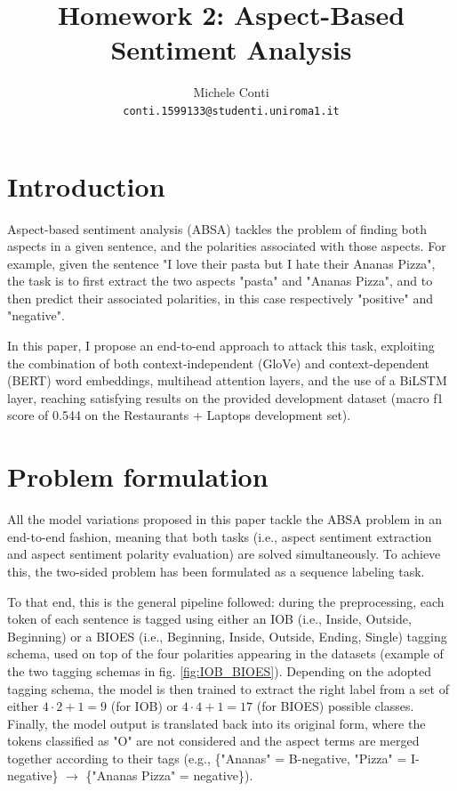 \documentclass[11pt,a4paper]{article}
\title{Homework 2: Aspect-Based Sentiment Analysis}
\author{Michele Conti \\
	\texttt{conti.1599133@studenti.uniroma1.it}\\}
\date{}
\begin{document}
	\maketitle
	\section{Introduction}
	Aspect-based sentiment analysis (ABSA) tackles the problem of finding both
	aspects in a given sentence, and the polarities associated with those aspects.
	For example, given the sentence "I love their pasta but I hate their Ananas
	Pizza", the task is to first extract the two aspects "pasta" and "Ananas Pizza",
	and to then predict their associated polarities, in this case respectively
	"positive" and "negative".
	
	In this paper, I propose an end-to-end approach to attack this task, exploiting
	the combination of both context-independent (GloVe) and context-dependent (BERT)
	word embeddings, multihead attention layers, and the use of a BiLSTM layer,
	reaching satisfying results on the provided development dataset (macro f1 score
	of 0.544 on the Restaurants + Laptops development set).
	
	\section{Problem formulation}
	All the model variations proposed in this paper tackle the ABSA problem in an
	end-to-end fashion, meaning that both tasks (i.e., aspect sentiment extraction
	and aspect sentiment polarity evaluation) are solved simultaneously. To achieve
	this, the two-sided problem has been formulated as a sequence labeling task. 
	
	To that end, this is the general pipeline followed: during the preprocessing,
	each token of each sentence is tagged using either an IOB (i.e., Inside,
	Outside, Beginning) or a BIOES (i.e., Beginning, Inside, Outside, Ending,
	Single) tagging schema, used on top of the four polarities appearing in the
	datasets (example of the two tagging schemas in fig. \ref{fig:IOB_BIOES}).
	Depending on the adopted tagging schema, the model is then trained to extract
	the right label from a set of either  $4 \cdot 2 + 1 = 9$ (for IOB) or $4 \cdot
	4 + 1 = 17$ (for BIOES) possible classes. Finally, the model output is
	translated back into its original form, where the tokens classified as "O" are
	not considered and the aspect terms are merged together according to their tags
	(e.g., \{"Ananas" = B-negative, "Pizza" = I-negative\} $\to$ \{"Ananas Pizza" =
	negative\}).
	
\end{document}
